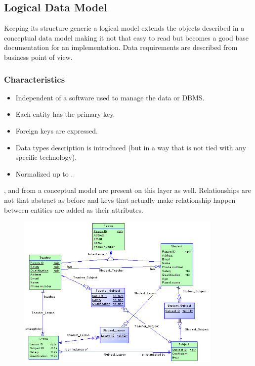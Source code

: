 \subsection{Logical Data Model}

Keeping its structure generic a logical model extends the objects described in a conceptual data model making it not that easy to read but becomes a good base documentation for an implementation. Data requirements are described from business point of view.

\subsubsection{Characteristics}
\begin{itemize}
	\item Independent of a software used to manage the data or DBMS.
	\item Each entity has the primary key.
	\item Foreign keys are expressed.
	\item Data types description is introduced (but in a way that is not tied with any specific technology).
	\item Normalized up to .
\end{itemize}
,  and  from a conceptual model are present on this layer as well. Relationships are not that abstract as before and keys that actually make relationship happen between entities are added as their attributes.

\begin{figure}[h]
	\centering
	\includegraphics[width=10cm]{../img/Logical_Model_PowerDesigner}
	\caption{\cite{LogicalModelExample}}
\end{figure}

